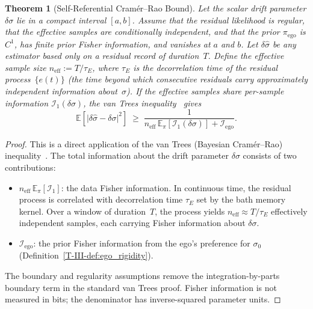 \documentclass[12pt,a4paper,openany]{book}
\newtheorem{theorem}{Theorem}[chapter]
\begin{document}
\begin{theorem}[Self-Referential Cram\'{e}r--Rao Bound]
\label{T-III-thm:SRCR}
Let the scalar drift parameter $\delta\sigma$ lie in a compact interval
$[a,b]$.  Assume that the residual likelihood is regular, that the
effective samples are conditionally independent, and that the prior
$\pi_{\mathrm{ego}}$ is $C^1$, has finite prior Fisher information,
and vanishes at $a$ and $b$.  Let $\delta\hat\sigma$ be any estimator
based only on a residual record of duration~$T$.
Define the \emph{effective sample size}
$n_{\mathrm{eff}} := T/\tau_E$, where $\tau_E$ is the
decorrelation time of the residual process~$\{e(t)\}$
(the time beyond which consecutive residuals carry
approximately independent information about~$\sigma$).
If the effective samples share per-sample information
$\mathcal I_1(\delta\sigma)$, the van Trees
inequality~\cite{vanTrees1968} gives
\begin{equation}
\label{T-III-eq:SRCR}
\mathbb{E}\!\left[
  \bigl|\delta\hat{\sigma} - \delta\sigma\bigr|^2
\right]
\;\geq\; \frac{1}{
  n_{\mathrm{eff}}\,\mathbb E_{\pi}[\mathcal I_1(\delta\sigma)]
  + \mathcal{I}_{\mathrm{ego}}}.
\end{equation}
\end{theorem}

\begin{proof}
This is a direct application of the van Trees
(Bayesian Cram\'{e}r--Rao)
inequality~\cite{vanTrees1968}.
The total information about the drift parameter $\delta\sigma$
consists of two contributions:
\begin{itemize}
\item $n_{\mathrm{eff}}\,\mathbb E_\pi[\mathcal I_1]$: the data
  Fisher information.  In continuous time, the residual
  process is correlated with decorrelation time $\tau_E$
  set by the bath memory kernel.
  Over a window of duration~$T$, the process yields
  $n_{\mathrm{eff}} \approx T/\tau_E$ effectively
  independent samples, each carrying Fisher information
  about $\delta\sigma$.
\item $\mathcal{I}_{\mathrm{ego}}$: the prior Fisher
  information from the ego's preference for $\sigma_0$
  (Definition~\ref{T-III-def:ego_rigidity}).
\end{itemize}
The boundary and regularity assumptions remove the
integration-by-parts boundary term in the standard van Trees proof.
Fisher information is not measured in bits; the denominator has
inverse-squared parameter units.
\end{proof}
\end{document}
